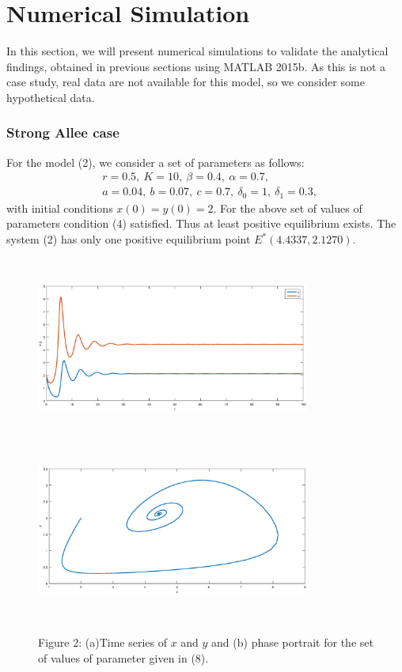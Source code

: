\documentclass[a4paper, 10pt]{article}
\begin{document}
	\section{Numerical Simulation}
In this section, we will present numerical simulations to validate the analytical findings, obtained in previous sections using MATLAB 2015b. As this is not a case study, real data are not available for this model, so we consider some hypothetical data.

\subsubsection{Strong Allee case}
For the model (2), we consider a set of parameters as follows:
\begin{equation}
\begin{split}
& r=0.5,~K=10,~\beta=0.4,~\alpha=0.7,\\
& a=0.04,~b=0.07,~c=0.7,~\delta_0=1,~\delta_1=0.3,
\end{split}
\end{equation}
with initial conditions $x(0)=y(0)=2.$
For the above set of values of parameters condition (4) satisfied. Thus at least positive equilibrium exists. The system (2) has only one positive equilibrium point $E^*(4.4337,2.1270).$ 
\begin{figure}[H]
	{\includegraphics[width=9cm, height=6cm]{6.eps}}
	\endminipage\hfill
	{\includegraphics[width=9cm, height=6cm]{7.eps}}
	\endminipage\hfill
	\begin{center} Figure 2: (a)Time series of $x$ and $y$ and (b) phase portrait  for the set of values of parameter given in (8).  \end{center}
\end{figure}
\end{document}
